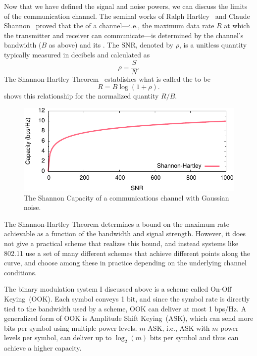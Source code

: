 Now that we have defined the signal and noise powers, we can discuss the limits of the communication channel. The seminal works of Ralph Hartley~\cite{Hartley_law} and Claude Shannon~\cite{Shannon_coding,Shannon_capacity} proved that the  of a channel---i.e., the maximum data rate $R$ at which the transmitter and receiver can communicate---is determined by the channel's bandwidth ($B$ as above) and its . The SNR\@, denoted by $\rho$, is a unitless quantity typically measured in decibels and calculated as
\begin{equation}
\rho = \frac{S}{N}.
\end{equation}
The Shannon-Hartley Theorem~\cite{Shannon_capacity} establishes what is called the  to be
\begin{equation}
\label{eq:shannon_capacity}
R = B\log(1+\rho).
\end{equation}
 shows this relationship for the normalized quantity $R/B$.

\begin{figure}[htb]
\centering
\includegraphics{calculations/shannon-crop}
\caption{\label{fig:shannon}The Shannon Capacity of a communications channel with Gaussian noise.}
\end{figure}

The Shannon-Hartley Theorem determines a bound on the maximum rate achievable as a function of the bandwidth and signal strength. However, it does not give a practical scheme that realizes this bound, and instead systems like 802.11 use a set of many different schemes that achieve different points along the curve, and choose among these in practice depending on the underlying channel conditions.

The binary modulation system I discussed above is a scheme called On-Off Keying~(OOK\@). Each symbol conveys 1 bit, and since the symbol rate is directly tied to the bandwidth used by a scheme, OOK can deliver at most 1 bps/Hz. A generalized form of OOK is Amplitude Shift Keying~(ASK\@), which can send more bits per symbol using multiple power levels. $m$-ASK, i.e., ASK with $m$ power levels per symbol, can deliver up to $\log_2(m)$ bits per symbol and thus can achieve a higher capacity.


